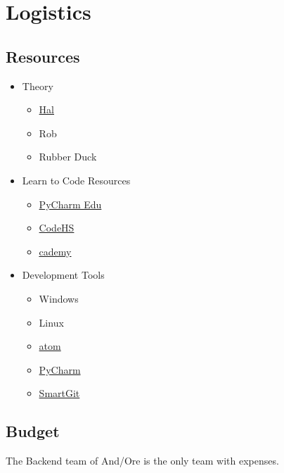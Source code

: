 \documentclass[11pt]{article}
\begin{document}
\section{{\color{blue}Logistics}}

\subsection{{\color{blue}Resources}}

\begin{itemize}
	\item Theory
		\begin{itemize}
			\item \href{http://baxter-academy.org/faculty#hlarsson}{Hal}
			\item Rob
			\item Rubber Duck
		\end{itemize}
	\item Learn to Code Resources
		\begin{itemize}
			\item \href{https://www.jetbrains.com/pycharm-edu/}{PyCharm Edu}
			\item \href{https://codehs.com/}{CodeHS}
			\item \href{http://www.codecademy.com/}{\underline{c}ademy}
		\end{itemize}
	\item Development Tools
		\begin{itemize}
			\item Windows
			\item Linux
			\item \href{https://atom.io/}{atom}
			\item \href{https://www.jetbrains.com/pycharm/}{PyCharm}
			\item \href{http://www.syntevo.com/smartgit/}{SmartGit}
		\end{itemize}
\end{itemize}

\subsection{{\color{blue}Budget}}

The Backend team of And/Ore is the only team with expenses.
\end{document}
